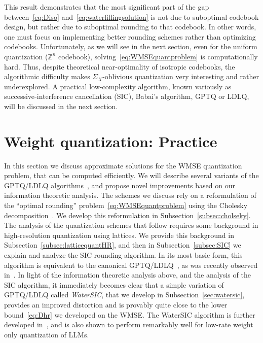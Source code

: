 \documentclass[journal]{IEEEtran}
\begin{document}
This result demonstrates that the most significant part of the gap between~\eqref{eq:Diso}
and~\eqref{eq:waterfillingsolution} is not due to suboptimal codebook design, but rather due to
suboptimal rounding to that codebook. In other words, one must focus on implementing better
rounding schemes rather than optimizing codebooks. Unfortunately, as we will see in the next
section, even for the uniform quantization ($\mathbb{Z}^n$ codebook),
solving~\eqref{eq:WMSEquantproblem} is computationally hard. Thus, despite theoretical near-optimality of
isotropic codebooks, the algorithmic difficulty makes $\Sigma_X$-oblivious quantization
very interesting and rather underexplored. A practical low-complexity algorithm, known variously as
successive-interference cancellation (SIC), Babai's algorithm, GPTQ or LDLQ, will be discussed in
the next section.



\section{Weight quantization: Practice}\label{sec:weightonly_practice}

In this section we discuss approximate solutions for the WMSE quantization problem, that can be computed efficiently. We will describe several variants of the GPTQ/LDLQ algorithms~\cite{frantar2023optq,chee2023quip}, and propose novel improvements based on our information theoretic analysis. The schemes we discuss rely on a reformulation of the ``optimal rounding'' problem~\eqref{eq:WMSEquantproblem} using the Cholesky decomposition~\cite{chen2025geometry,birnick2025lattice}. We develop this reformulation in Subsection~\ref{subsec:cholseky}. The analysis of the quantization schemes that follow requires some background in high-resolution quantization using lattices. We provide this background in Subsection~\ref{subsec:latticequantHR}, and then in Subsection~\ref{subsec:SIC} we explain and analyze the SIC rounding algorithm. In its most basic form, this algorithm is equivalent to the canonical GPTQ/LDLQ~\cite{frantar2023optq,chee2023quip}, as was recently observed in~\cite{chen2025geometry,birnick2025lattice}. In light of the information theoretic analysis above, and the analysis of the SIC algorithm, it immediately becomes clear that a simple variation of GPTQ/LDLQ called \emph{WaterSIC}, that we develop in Subsection~\ref{sec:watersic}, provides an improved distortion and is provably quite close to the lower bound~\eqref{eq:Dhr} we developed on the WMSE. The WaterSIC algorithm is further developed in~\cite{lifar2026watersic}, and is also shown to perform remarkably well for low-rate weight only quantization of LLMs.
\end{document}
